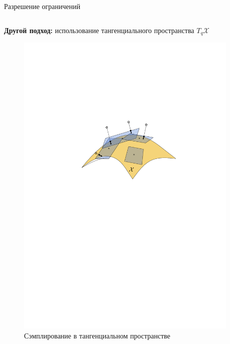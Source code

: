 \documentclass[11pt, aspectratio=169]{beamer}
\begin{document}
\begin{frame}{Разрешение ограничений}
    \begin{columns}[onlytextwidth]
        \begin{column}{0.4\textwidth}
            \textbf{Другой подход:} использование тангенциального пространства $T_q\mathcal{X}$
            \begin{figure}
                \centering
                \includegraphics[width=1.0\textwidth]{figures/graph/tb_sampling.pdf}
                \caption{Сэмплирование в тангенциальном пространстве}
                \label{fig:tb_sampling}
            \end{figure}
        \end{column}
        \begin{column}{0.58\textwidth}
            \begin{algorithm}[H]
                \scriptsize

\end{algorithm}
\end{column}
\end{columns}
\end{frame}
\end{document}
